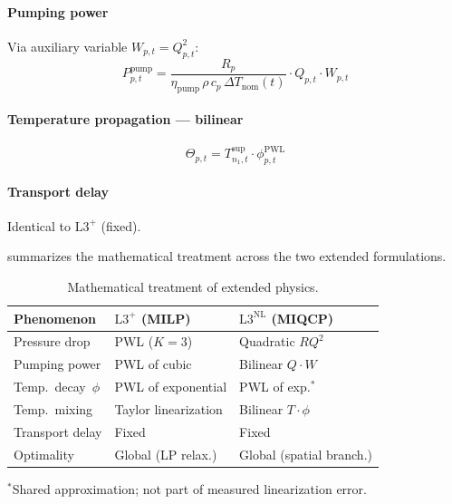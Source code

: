 \documentclass[review,3p]{elsarticle}
\newcommand{\Lplus}{\mathrm{L3}^{+}}
\newcommand{\Lnl}{\mathrm{L3}^{\mathrm{NL}}}
\begin{document}
\paragraph{Pumping power}
Via auxiliary variable $W_{p,t} = Q_{p,t}^2$:
\begin{equation}
  P_{p,t}^{\mathrm{pump}} =
    \frac{R_p}{\eta_{\mathrm{pump}}\, \rho\, c_p\,
      \Delta T_{\mathrm{nom}}(t)}
    \cdot Q_{p,t} \cdot W_{p,t}
  \label{eq:pump_bilinear}
\end{equation}

\paragraph{Temperature propagation --- bilinear}
\begin{equation}
  \Theta_{p,t} = T_{n_1,t}^{\mathrm{sup}}
    \cdot \phi_{p,t}^{\mathrm{PWL}}
  \label{eq:bilinear_temp}
\end{equation}

\paragraph{Transport delay}
Identical to $\Lplus$ (fixed).

 summarizes the mathematical treatment across
the two extended formulations.

\begin{table}[htbp]
\centering
\caption{Mathematical treatment of extended physics.}
\label{tab:lplus_vs_lnl}
\small
\begin{tabular}{@{} l l l @{}}
\toprule
Phenomenon & $\Lplus$ (MILP) & $\Lnl$ (MIQCP) \\
\midrule
Pressure drop   & PWL ($K{=}3$)       & Quadratic $RQ^2$ \\
Pumping power   & PWL of cubic        & Bilinear $Q \cdot W$ \\
Temp.\ decay~$\phi$ & PWL of exponential & PWL of exp.$^{*}$ \\
Temp.\ mixing   & Taylor linearization & Bilinear $T \cdot \phi$ \\
Transport delay & Fixed               & Fixed \\
\midrule
Optimality      & Global (LP relax.)  & Global (spatial branch.) \\
\bottomrule
\end{tabular}

\vspace{2pt}
\raggedright\footnotesize
$^{*}$Shared approximation; not part of measured linearization error.
\end{table}
\end{document}
